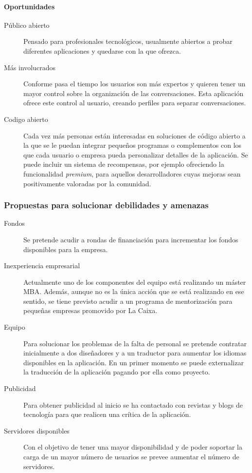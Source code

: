 \documentclass[11pt,leqno]{article}
\begin{document}
\paragraph{Oportunidades}
\begin{description}

	\item[Público abierto] Pensado para profesionales tecnológicos, usualmente 
	abiertos a probar diferentes aplicaciones y quedarse con la 
	que ofrezca.
	\item[Más involucrados] Conforme pasa el tiempo los usuarios son más 
	expertos y quieren tener
	un mayor control sobre la organización de las conversaciones. Esta aplicación
	ofrece este control al usuario, creando perfiles para separar conversaciones.
	\item[Codigo abierto] Cada vez más personas están interesadas en soluciones
	de código abierto a la que se le puedan integrar pequeños programas o 
	complementos con los que cada usuario o empresa pueda personalizar detalles
	de la aplicación. Se puede incluir un sistema de recompensas, por ejemplo 
	ofreciendo la funcionalidad \textit{premium}, para aquellos desarrolladores
	cuyas mejoras sean positivamente valoradas por la comunidad.
\end{description}


\subsubsection{Propuestas para solucionar debilidades y amenazas}

\begin{description}
	\item[Fondos] Se pretende acudir a rondas de financiación para incrementar
	los fondos disponibles para la empresa.
	
	\item[Inexperiencia empresarial] Actualmente uno de los componentes del
	equipo está realizando un máster MBA. Además, aunque no es la única acción
	que se está realizando en ese sentido, se tiene previsto acudir a un 
	programa de mentorización para pequeñas empresas promovido por La Caixa.
	
	\item[Equipo] Para solucionar los problemas de la falta de personal se pretende
	contratar inicialmente a dos diseñadores y a un traductor para aumentar los 
	idiomas disponibles en la aplicación. En un primer momento se puede 
	externalizar la traducción de la aplicación pagando por ella como
	proyecto. 
	
	\item[Publicidad] Para obtener publicidad al inicio se ha contactado con 
	revistas y blogs de tecnología para que realicen una crítica de la
	aplicación.
	
	\item[Servidores disponibles] Con el objetivo de tener una mayor disponibilidad
	y de poder soportar la carga de un mayor número de usuarios se prevee
	aumentar el número de servidores.
	
\end{description}
	 
\end{document}
